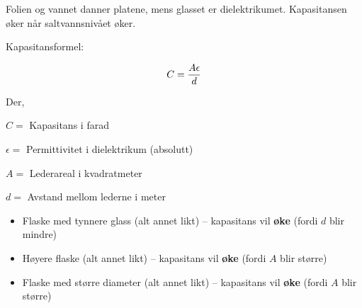 
Folien og vannet danner platene, mens glasset er dielektrikumet.  Kapasitansen øker når saltvannsnivået øker.

\vskip 10pt

Kapasitansformel:

$$C = {{A \epsilon} \over d}$$

\noindent
Der,

$C =$ Kapasitans i farad

$\epsilon =$ Permittivitet i dielektrikum (absolutt)

$A =$ Lederareal i kvadratmeter

$d =$ Avstand mellom lederne i meter

\vskip 10pt

\begin{itemize}
\item{} Flaske med tynnere glass (alt annet likt) -- kapasitans vil {\bf øke} (fordi $d$ blir mindre)
\item{} Høyere flaske (alt annet likt) -- kapasitans vil {\bf øke} (fordi $A$ blir større)
\item{} Flaske med større diameter (alt annet likt) -- kapasitans vil {\bf øke} (fordi $A$ blir større)
\end{itemize}


